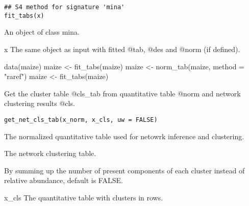 \documentclass[a4paper]{book}
\begin{document}
%
\begin{Usage}
\begin{verbatim}
## S4 method for signature 'mina'
fit_tabs(x)
\end{verbatim}
\end{Usage}
%
\begin{Arguments}
\begin{ldescription}
\item[\code{x}] An object of class mina.
\end{ldescription}
\end{Arguments}
%
\begin{Value}
x The same object as input with fitted @tab, @des and @norm (if
defined).
\end{Value}
%
\begin{Examples}
\begin{ExampleCode}
{
data(maize)
maize <- fit_tabs(maize)
maize <- norm_tab(maize, method = "raref")
maize <- fit_tabs(maize)
}
\end{ExampleCode}
\end{Examples}
%
\begin{Description}\relax
Get the cluster table @cls\_tab from quantitative table @norm and network
clustering results @cls.
\end{Description}
%
\begin{Usage}
\begin{verbatim}
get_net_cls_tab(x_norm, x_cls, uw = FALSE)
\end{verbatim}
\end{Usage}
%
\begin{Arguments}
\begin{ldescription}
\item[\code{x\_norm}] The normalized quantitative table used for netowrk inference
and clustering.

\item[\code{x\_cls}] The network clustering table.

\item[\code{uw}] By summing up the number of present components of each cluster
instead of relative abundance, default is FALSE.
\end{ldescription}
\end{Arguments}
%
\begin{Value}
x\_cls The quantitative table with clusters in rows.
\end{Value}
\end{document}
